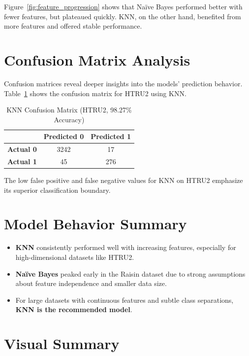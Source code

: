 Figure~\ref{fig:feature_progression} shows that Naïve Bayes performed better with fewer features, but plateaued quickly. KNN, on the other hand, benefited from more features and offered stable performance.

\section{Confusion Matrix Analysis}
\label{sec:comp_confmat}

Confusion matrices reveal deeper insights into the models’ prediction behavior. Table~\ref{tab:htru2_knn_cm} shows the confusion matrix for HTRU2 using KNN.

\begin{table}[H]
    \centering
    \caption{KNN Confusion Matrix (HTRU2, 98.27\% Accuracy)}
    \label{tab:htru2_knn_cm}
    \begin{tabular}{|c|c|c|}
        \hline
        & \textbf{Predicted 0} & \textbf{Predicted 1} \\
        \hline
        \textbf{Actual 0} & 3242 & 17 \\
        \textbf{Actual 1} & 45 & 276 \\
        \hline
    \end{tabular}
\end{table}

The low false positive and false negative values for KNN on HTRU2 emphasize its superior classification boundary.

\section{Model Behavior Summary}
\label{sec:comp_summary}

\begin{itemize}
    \item \textbf{KNN} consistently performed well with increasing features, especially for high-dimensional datasets like HTRU2.
    \item \textbf{Naïve Bayes} peaked early in the Raisin dataset due to strong assumptions about feature independence and smaller data size.
    \item For large datasets with continuous features and subtle class separations, \textbf{KNN is the recommended model}.
\end{itemize}

\section{Visual Summary}

